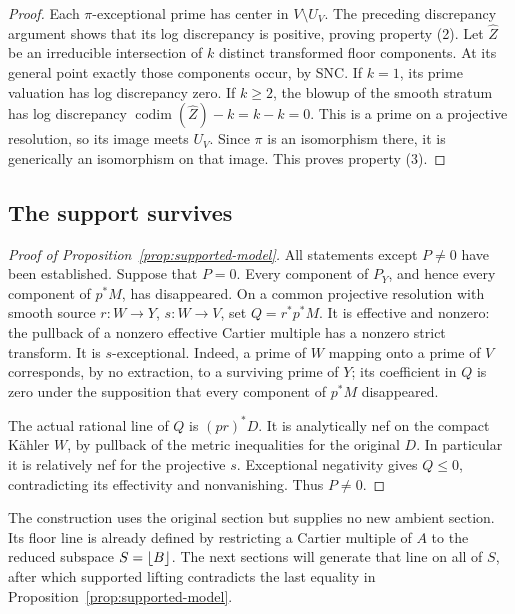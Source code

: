 \begin{proof}
Each \(\pi\)-exceptional prime has center in \(V\setminus U_V\).  The
preceding discrepancy argument shows that its log discrepancy is positive,
proving property (2).  Let \(\widehat Z\) be an irreducible intersection
of \(k\) distinct transformed floor components.  At its general point
exactly those components occur, by SNC.  If \(k=1\), its prime valuation
has log discrepancy zero.  If \(k\geq2\), the blowup of the smooth stratum
has log discrepancy \(\operatorname{codim}(\widehat Z)-k=k-k=0\).
This is a prime on a projective resolution, so its image meets \(U_V\).
Since \(\pi\) is an isomorphism there, it is generically an isomorphism
on that image.  This proves property (3).
\end{proof}

\subsection{The support survives}

\begin{proof}[Proof of Proposition~\ref{prop:supported-model}]
All statements except \(P\ne0\) have been established.  Suppose that
\(P=0\).  Every component of \(P_Y\), and hence every component of
\(p^*M\), has disappeared.  On a common projective resolution with smooth source
\(r:W\to Y\), \(s:W\to V\), set \(Q=r^*p^*M\).  It is effective and
nonzero: the pullback of a nonzero effective Cartier multiple has a
nonzero strict transform.  It is \(s\)-exceptional.  Indeed, a prime of
\(W\) mapping onto a prime of \(V\) corresponds, by no extraction, to
a surviving prime of \(Y\); its coefficient in \(Q\) is zero under the
supposition that every component of \(p^*M\) disappeared.

The actual rational line of \(Q\) is \((pr)^*D\).  It is analytically
nef on the compact K\"ahler \(W\), by pullback of the metric inequalities
for the original \(D\).  In particular it is relatively nef for the
projective \(s\).  Exceptional negativity gives \(Q\leq0\), contradicting
its effectivity and nonvanishing.  Thus \(P\ne0\).
\end{proof}

The construction uses the original section but supplies no new ambient
section.  Its floor line is already defined by restricting a Cartier
multiple of \(A\) to the reduced subspace \(S=\left\lfloor B\right\rfloor\).  The next
sections will generate that line on all of \(S\), after which supported
lifting contradicts the last equality in
Proposition~\ref{prop:supported-model}.
